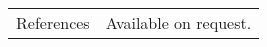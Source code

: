 \documentclass[12pt]{article}
\begin{document}
\begin{minipage}[t][0pt]{\linewidth}
\begin{tabular}[t]{p{2cm} p{14cm}}
	{References} &
		Available on request.
\end{tabular}
\end{minipage}
\end{document}
